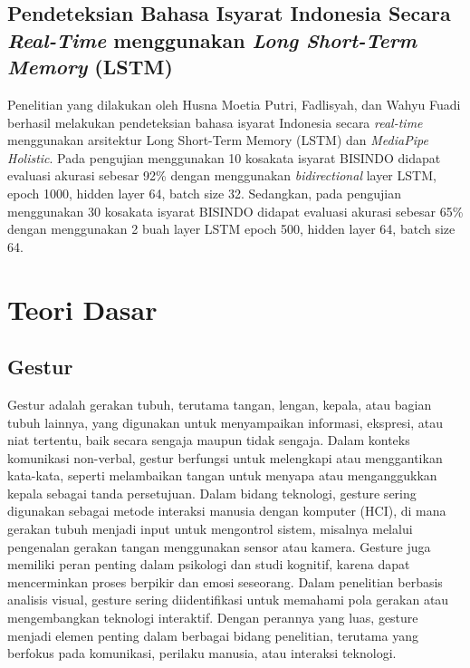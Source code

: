 \subsection{Pendeteksian Bahasa Isyarat Indonesia Secara \emph{Real-Time} menggunakan \emph{Long Short-Term Memory} (LSTM)}
Penelitian yang dilakukan oleh Husna Moetia Putri, Fadlisyah, dan Wahyu Fuadi berhasil
melakukan pendeteksian bahasa isyarat Indonesia secara \emph{real-time} menggunakan arsitektur Long Short-Term Memory (LSTM) dan \emph{MediaPipe Holistic}. Pada pengujian menggunakan 10 kosakata isyarat BISINDO didapat evaluasi akurasi sebesar 92\% dengan menggunakan \emph{bidirectional} layer LSTM, epoch 1000, hidden layer 64, batch size 32. Sedangkan, pada pengujian menggunakan 30 kosakata isyarat BISINDO didapat evaluasi akurasi sebesar 65\% dengan menggunakan 2 buah layer LSTM epoch 500, hidden layer 64, batch size 64. 

\section{Teori Dasar}
\subsection{Gestur}
Gestur adalah gerakan tubuh, terutama tangan, lengan, kepala, atau bagian tubuh lainnya, yang digunakan untuk menyampaikan informasi, ekspresi, atau niat tertentu, baik secara sengaja maupun tidak sengaja. Dalam konteks komunikasi non-verbal, gestur berfungsi untuk melengkapi atau menggantikan kata-kata, seperti melambaikan tangan untuk menyapa atau menganggukkan kepala sebagai tanda persetujuan. Dalam bidang teknologi, gesture sering digunakan sebagai metode interaksi manusia dengan komputer (HCI), di mana gerakan tubuh menjadi input untuk mengontrol sistem, misalnya melalui pengenalan gerakan tangan menggunakan sensor atau kamera. Gesture juga memiliki peran penting dalam psikologi dan studi kognitif, karena dapat mencerminkan proses berpikir dan emosi seseorang. Dalam penelitian berbasis analisis visual, gesture sering diidentifikasi untuk memahami pola gerakan atau mengembangkan teknologi interaktif. Dengan perannya yang luas, gesture menjadi elemen penting dalam berbagai bidang penelitian, terutama yang berfokus pada komunikasi, perilaku manusia, atau interaksi teknologi.
